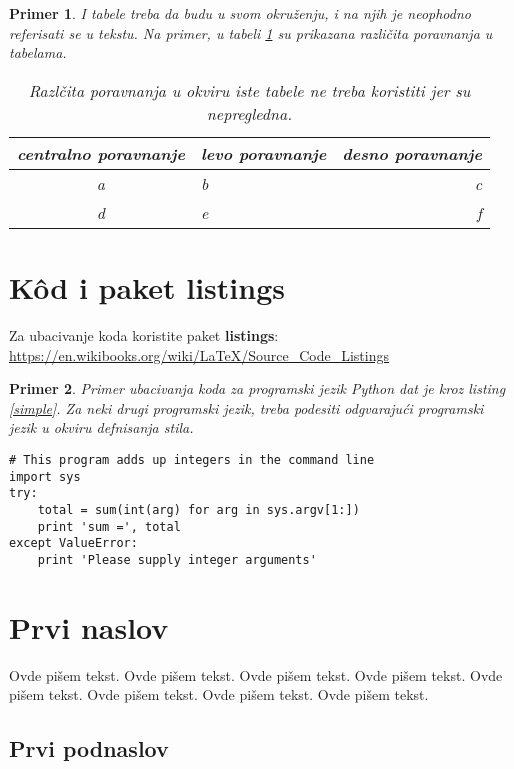 \documentclass[a4paper]{article}
\newtheorem{primer}{Primer}[section]
\begin{document}
\begin{primer} I tabele treba da budu u svom okruženju, i na njih je neophodno referisati se u tekstu. Na primer, u tabeli \ref{tab:tabela1} su prikazana različita poravnanja u tabelama.

\begin{table}[h!]
\begin{center}
\caption{Razlčita poravnanja u okviru iste tabele ne treba koristiti jer su nepregledna.}
\begin{tabular}{|c|l|r|} \hline
centralno poravnanje& levo poravnanje& desno poravnanje\\ \hline
a &b&c\\ \hline
d &e&f\\ \hline
\end{tabular}
\label{tab:tabela1}
\end{center}
\end{table}

\end{primer}

\section{K\^{o}d i paket listings}
Za ubacivanje koda koristite paket \textbf{listings}:
\url{https://en.wikibooks.org/wiki/LaTeX/Source_Code_Listings}

\begin{primer}
Primer ubacivanja koda za programski jezik Python dat je kroz listing \ref{simple}. Za neki drugi programski jezik, treba podesiti odgvarajući programski jezik u okviru defnisanja stila.
\end{primer}
\begin{lstlisting}[caption={Primer ubacivanja koda u tekst},frame=single, label=simple]
# This program adds up integers in the command line
import sys
try:
    total = sum(int(arg) for arg in sys.argv[1:])
    print 'sum =', total
except ValueError:
    print 'Please supply integer arguments'
\end{lstlisting}


\section{Prvi naslov}
\label{sec:naslov1}


Ovde pišem tekst. 
Ovde pišem tekst. 
Ovde pišem tekst. 
Ovde pišem tekst. 
Ovde pišem tekst. 
Ovde pišem tekst. 
Ovde pišem tekst. 
Ovde pišem tekst. 


\subsection{Prvi podnaslov}
\label{subsec:podnaslov1}
\end{document}
